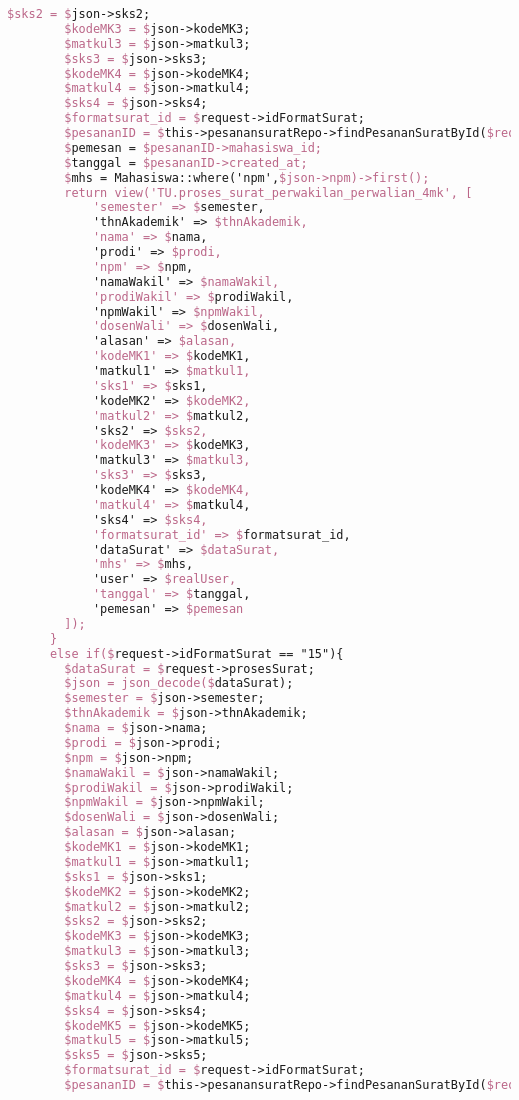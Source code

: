 \begin{lstlisting}[language=tex,basicstyle=\tiny,caption=PesanansuratController.php]
        $sks2 = $json->sks2;
        $kodeMK3 = $json->kodeMK3;
        $matkul3 = $json->matkul3;
        $sks3 = $json->sks3;
        $kodeMK4 = $json->kodeMK4;
        $matkul4 = $json->matkul4;
        $sks4 = $json->sks4;
        $formatsurat_id = $request->idFormatSurat;
        $pesananID = $this->pesanansuratRepo->findPesananSuratById($request->id);
        $pemesan = $pesananID->mahasiswa_id;
        $tanggal = $pesananID->created_at;
        $mhs = Mahasiswa::where('npm',$json->npm)->first();
        return view('TU.proses_surat_perwakilan_perwalian_4mk', [
            'semester' => $semester,
            'thnAkademik' => $thnAkademik,
            'nama' => $nama,
            'prodi' => $prodi,
            'npm' => $npm,
            'namaWakil' => $namaWakil,
            'prodiWakil' => $prodiWakil,
            'npmWakil' => $npmWakil,
            'dosenWali' => $dosenWali,
            'alasan' => $alasan,
            'kodeMK1' => $kodeMK1,
            'matkul1' => $matkul1,
            'sks1' => $sks1,
            'kodeMK2' => $kodeMK2,
            'matkul2' => $matkul2,
            'sks2' => $sks2,
            'kodeMK3' => $kodeMK3,
            'matkul3' => $matkul3,
            'sks3' => $sks3,
            'kodeMK4' => $kodeMK4,
            'matkul4' => $matkul4,
            'sks4' => $sks4,
            'formatsurat_id' => $formatsurat_id,
            'dataSurat' => $dataSurat,
            'mhs' => $mhs,
            'user' => $realUser,
            'tanggal' => $tanggal,
            'pemesan' => $pemesan
        ]);
      }
      else if($request->idFormatSurat == "15"){
        $dataSurat = $request->prosesSurat;
        $json = json_decode($dataSurat);
        $semester = $json->semester;
        $thnAkademik = $json->thnAkademik;
        $nama = $json->nama;
        $prodi = $json->prodi;
        $npm = $json->npm;
        $namaWakil = $json->namaWakil;
        $prodiWakil = $json->prodiWakil;
        $npmWakil = $json->npmWakil;
        $dosenWali = $json->dosenWali;
        $alasan = $json->alasan;
        $kodeMK1 = $json->kodeMK1;
        $matkul1 = $json->matkul1;
        $sks1 = $json->sks1;
        $kodeMK2 = $json->kodeMK2;
        $matkul2 = $json->matkul2;
        $sks2 = $json->sks2;
        $kodeMK3 = $json->kodeMK3;
        $matkul3 = $json->matkul3;
        $sks3 = $json->sks3;
        $kodeMK4 = $json->kodeMK4;
        $matkul4 = $json->matkul4;
        $sks4 = $json->sks4;
        $kodeMK5 = $json->kodeMK5;
        $matkul5 = $json->matkul5;
        $sks5 = $json->sks5;
        $formatsurat_id = $request->idFormatSurat;
        $pesananID = $this->pesanansuratRepo->findPesananSuratById($request->id);

\end{lstlisting}

